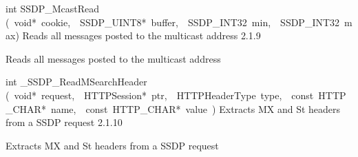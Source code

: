 \documentclass{article}
\begin{document}
\begin{cxxentry}
\begin{cxxentry}
\begin{cxxfunction}
\begin{cxxdoc}
\end{cxxdoc}
\end{cxxfunction}
\begin{cxxfunction}
{int}
        {SSDP\_McastRead}
        {(\ void*\ cookie,\ \ SSDP\_UINT8*\ buffer,\ \ SSDP\_INT32\ min,\ \ SSDP\_INT32\ max)}
        {Reads all messages posted to the multicast address}
        {2.1.9}
\begin{cxxdoc}
Reads all messages posted to the multicast address


\end{cxxdoc}
\end{cxxfunction}
\begin{cxxfunction}
{int}
        {\_SSDP\_ReadMSearchHeader}
        {(\ void*\ request,\ \ HTTPSession*\ ptr,\ \ HTTPHeaderType\ type,\ \ const\ HTTP\_CHAR*\ name,\ \ const\ HTTP\_CHAR*\ value\ )}
        {Extracts MX and St headers from a SSDP request}
        {2.1.10}
\begin{cxxdoc}
Extracts MX and St headers from a SSDP request



\end{cxxdoc}
\end{cxxfunction}
\end{cxxentry}
\end{cxxentry}
\end{document}
